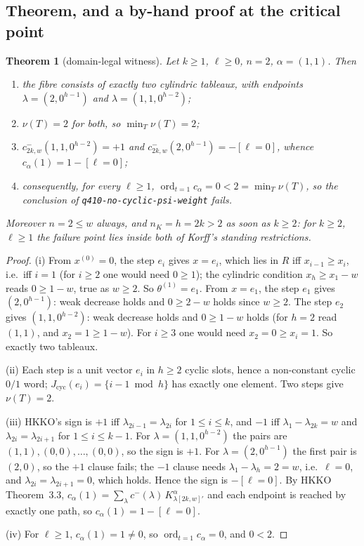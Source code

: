 \documentclass[11pt]{article}
\newtheorem{theorem}{Theorem}
\theoremstyle{definition}
\DeclareMathOperator{\ord}{ord}
\begin{document}
\subsection{Theorem, and a by-hand proof at the critical point}

\begin{theorem}[domain-legal witness]\label{thm:A}
Let $k\ge1$, $\ell\ge0$, $n=2$, $\alpha=(1,1)$.  Then
\begin{enumerate}
\item[(i)] the fibre consists of exactly two cylindric tableaux, with endpoints
  $\lambda=(2,0^{h-1})$ and $\lambda=(1,1,0^{h-2})$;
\item[(ii)] $\nu(T)=2$ for both, so $\min_T\nu(T)=2$;
\item[(iii)] $c^-_{2k,w}(1,1,0^{h-2})=+1$ and
  $c^-_{2k,w}(2,0^{h-1})=-[\ell=0]$, whence $c_\alpha(1)=1-[\ell=0]$;
\item[(iv)] consequently, for every $\ell\ge1$, $\ord_{t=1}c_\alpha=0<2=\min_T\nu(T)$,
  so the conclusion of \textup{\texttt{q410-no-cyclic-psi-weight}} fails.
\end{enumerate}
Moreover $n=2\le w$ always, and $n_K=h=2k>2$ as soon as $k\ge2$: for $k\ge2$, $\ell\ge1$
the failure point lies \emph{inside both} of Korff's standing restrictions.
\end{theorem}

\begin{proof}
(i) From $x^{(0)}=0$, the step $e_i$ gives $x=e_i$, which lies in $R$ iff
$x_{i-1}\ge x_i$, i.e.\ iff $i=1$ (for $i\ge2$ one would need $0\ge1$); the cylindric
condition $x_h\ge x_1-w$ reads $0\ge 1-w$, true as $w\ge2$.  So $\theta^{(1)}=e_1$.
From $x=e_1$, the step $e_1$ gives $(2,0^{h-1})$: weak decrease holds and
$0\ge 2-w$ holds since $w\ge2$.  The step $e_2$ gives $(1,1,0^{h-2})$: weak decrease
holds and $0\ge1-w$ holds (for $h=2$ read $(1,1)$, and $x_2=1\ge 1-w$).  For $i\ge3$
one would need $x_2=0\ge x_i=1$.  So exactly two tableaux.

(ii) Each step is a unit vector $e_i$ in $h\ge2$ cyclic slots, hence a non-constant
cyclic $0/1$ word; $J_{\mathrm{cyc}}(e_i)=\{i-1 \bmod h\}$ has exactly one element.
Two steps give $\nu(T)=2$.

(iii) HKKO's sign is $+1$ iff $\lambda_{2i-1}=\lambda_{2i}$ for $1\le i\le k$, and $-1$
iff $\lambda_1-\lambda_{2k}=w$ and $\lambda_{2i}=\lambda_{2i+1}$ for $1\le i\le k-1$.
For $\lambda=(1,1,0^{h-2})$ the pairs are $(1,1),(0,0),\dots,(0,0)$, so the sign is
$+1$.  For $\lambda=(2,0^{h-1})$ the first pair is $(2,0)$, so the $+1$ clause fails;
the $-1$ clause needs $\lambda_1-\lambda_h=2=w$, i.e.\ $\ell=0$, and
$\lambda_{2i}=\lambda_{2i+1}=0$, which holds.  Hence the sign is $-[\ell=0]$.
By HKKO Theorem~3.3, $c_\alpha(1)=\sum_\lambda c^-(\lambda)\,K^\alpha_{\lambda[2k,w]'}$
and each endpoint is reached by exactly one path, so $c_\alpha(1)=1-[\ell=0]$.

(iv) For $\ell\ge1$, $c_\alpha(1)=1\ne0$, so $\ord_{t=1}c_\alpha=0$, and $0<2$.
\end{proof}
\end{document}
